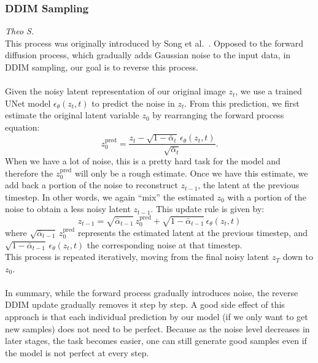 \subsubsection{DDIM Sampling}
\label{sec:ddim_sampling}
\textit{Theo S.}\\
This process was originally introduced by Song et al.~\cite{song2021denoising}. 
Opposed to the forward diffusion process, which gradually adds Gaussian noise to the input data, in DDIM sampling, our goal is to reverse this process. 
\\\\
Given the noisy latent representation of our original image \( z_t \), 
we use a trained UNet model \(\epsilon_\theta(z_t,t)\) to predict the noise in \( z_t \). 
From this prediction, we first estimate the original latent variable \( z_0 \) by rearranging the forward process equation:
\begin{equation}
    z_0^{\text{pred}} = \frac{z_t - \sqrt{1-\bar{\alpha}_t}\,\epsilon_\theta(z_t,t)}{\sqrt{\bar{\alpha}_t}}.
\end{equation}
When we have a lot of noise, this is a pretty hard task for the model and therefore the \( z_0^{\text{pred}} \) will only be a rough estimate.
Once we have this estimate, we add back a portion of the noise to reconstruct \( z_{t-1} \), the latent at the previous timestep.
In other words, we again “mix” the estimated \( z_0 \) with a portion of the noise to obtain a less noisy latent \( z_{t-1} \).
This update rule is given by:
\begin{equation}
    z_{t-1} = \sqrt{\bar{\alpha}_{t-1}}\,z_0^{\text{pred}} + \sqrt{1-\bar{\alpha}_{t-1}}\,\epsilon_\theta(z_t,t)
\end{equation}
where \(\sqrt{\bar{\alpha}_{t-1}}\,z_0^{\text{pred}}\) represents the estimated latent at the previous timestep, and \(\sqrt{1-\bar{\alpha}_{t-1}}\,\epsilon_\theta(z_t,t)\) the corresponding noise at that timestep.  
\\[1ex]
This process is repeated iteratively, moving from the final noisy latent \( z_T \) down to \( z_0 \).
\\\\
In summary, while the forward process gradually introduces noise, the reverse DDIM update gradually removes it step by step. 
A good side effect of this approach is that each individual prediction by our model (if we only want to get new samples) does not need to be perfect.
Because as the noise level decreases in later stages, the task becomes easier, one can still generate good samples even if the model is not perfect at every step.


